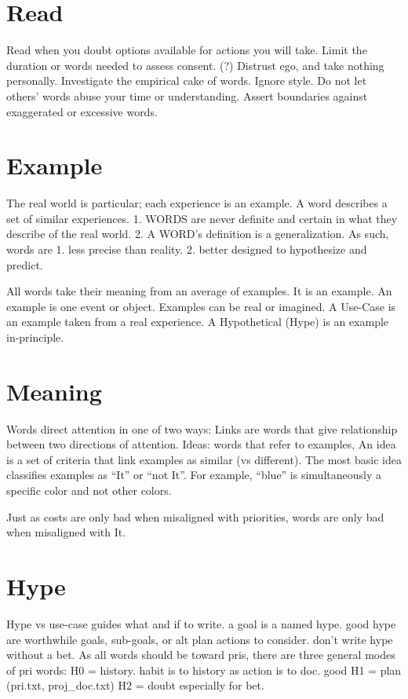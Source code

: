 \documentclass[
]{book}
\begin{document}
\section{Read}\label{word-read}

Read when you doubt options available for actions you will take.
Limit the duration or words needed to assess consent. (?)
Distrust ego, and take nothing personally.
Investigate the empirical cake of words.
Ignore style.
Do not let others' words abuse your time or understanding.
Assert boundaries against exaggerated or excessive words.

\section{Example}\label{word-example}

The real world is particular; each experience is an example.
A word describes a set of similar experiences.
1. WORDS are never definite and certain in what they describe of the real world.
2. A WORD's definition is a generalization.
As such, words are
1. less precise than reality.
2. better designed to hypothesize and predict.

All words take their meaning from an average of examples.
It is an example.
An example is one event or object.
Examples can be real or imagined.
A Use-Case is an example taken from a real experience.
A Hypothetical (Hype) is an example in-principle.

\section{Meaning}\label{meaning}

Words direct attention in one of two ways:
Links are words that give relationship between two directions of attention.
Ideas: words that refer to examples,
An idea is a set of criteria that link examples as similar (vs different).
The most basic idea classifies examples as ``It'' or ``not It''.
For example, ``blue'' is simultaneously a specific color and not other colors.

Just as costs are only bad when misaligned with priorities, words are only bad when misaligned with It.

\section{Hype}\label{hype}

Hype vs use-case guides what and if to write. a goal is a named hype. good hype are worthwhile goals, sub-goals, or alt plan actions to consider. don't write hype without a bet.
As all words should be toward pris, there are three general modes of pri words:
H0 = history. habit is to history as action is to doc. good
H1 = plan (pri.txt, proj\_doc.txt)
H2 = doubt especially for bet.
\end{document}
